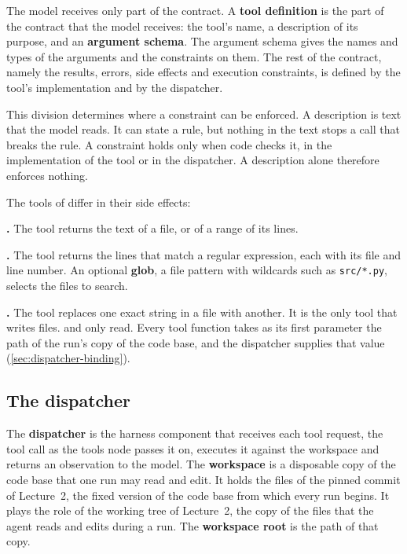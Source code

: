 The model receives only part of the contract. A \textbf{tool definition} is the part of the
contract that the model receives: the tool's name, a description of its purpose, and an
\textbf{argument schema}. The argument schema gives the names and types of the arguments and the
constraints on them. The rest of the contract, namely the results, errors, side effects and
execution constraints, is defined by the tool's implementation and by the dispatcher.

This division determines where a constraint can be enforced. A description is text that the model
reads. It can state a rule, but nothing in the text stops a call that breaks the rule. A constraint
holds only when code checks it, in the implementation of the tool or in the dispatcher. A
description alone therefore enforces nothing.

The tools of \msa{} differ in their side effects:
\bi
\item \textbf{.} The tool returns the text of a file, or of a range of its
lines.
\item \textbf{.} The tool returns the lines that match a regular expression, each
with its file and line number. An optional \textbf{glob}, a file pattern with wildcards such as
\texttt{src/*.py}, selects the files to search.
\item \textbf{.} The tool replaces one exact string in a file with another. It is the
only tool that writes files.
\ei
{} and  only read. Every tool function takes as its first
parameter the path of the run's copy of the code base, and the dispatcher supplies that value
(\cref{sec:dispatcher-binding}).

\subsection{The dispatcher}
\label{sec:dispatcher-role}

The \textbf{dispatcher} is the harness component that receives each tool request, the tool call as
the tools node passes it on, executes it against the workspace and returns an observation to the
model. The \textbf{workspace} is a disposable copy of the code base that one run may read and edit.
It holds the files of the pinned commit of Lecture~2, the fixed version of the code base from which
every run begins. It plays the role of the working tree of Lecture~2, the copy of the files that the
agent reads and edits during a run. The \textbf{workspace root} is the path of that copy.


